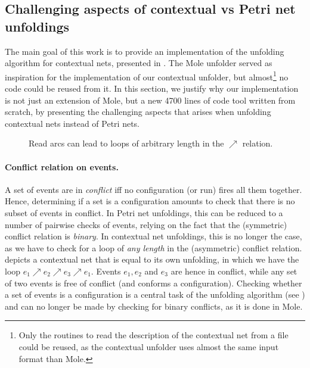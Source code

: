 \documentclass[11pt,a4paper]{article}
\begin{document}
\subsection{Challenging aspects of contextual vs Petri net unfoldings}
\label{sec:challenging.aspects}

The main goal of this work is to provide an implementation of the unfolding
algorithm for contextual nets, presented in .  The Mole
unfolder  served as inspiration for the implementation of our
contextual unfolder, but almost\footnote{Only the routines to read the
description of the contextual net from a file could be reused, as the
contextual unfolder uses almost the same input format than Mole.} no code could
be reused from it.  In this section, we justify why our implementation is not
just an extension of Mole, but a new 4700 lines of code tool written from
scratch, by presenting the challenging aspects that arises when unfolding
contextual nets instead of Petri nets.

\begin{figure}
\caption{Read arcs can lead to loops of arbitrary length in the $\nearrow$
relation.}
\label{fig:read.arcs}
\end{figure}

\paragraph{Conflict relation on events.}  A set of events are in
\emph{conflict} iff no configuration (or run) fires all them together.  Hence,
determining if a set is a configuration amounts to check that there is no
subset of events in conflict.  In Petri net unfoldings, this can be reduced to a
number of pairwise checks of events, relying on the fact that the (symmetric)
conflict relation is \emph{binary}.  In contextual net unfoldings, this is no
longer the case, as we have to check for a loop of \emph{any length} in the
(asymmetric) conflict relation.   depicts a contextual net that
is equal to its own unfolding, in which we have the loop $e_1 \nearrow e_2
\nearrow e_3 \nearrow e_1$.  Events $e_1, e_2$ and $e_3$ are hence in conflict,
while any set of two events is free of conflict (and conforms a configuration).
Checking whether a set of events is a configuration is a central task of the
unfolding algorithm (see ) and can no longer be made
by checking for binary conflicts, as it is done in Mole.
\end{document}
